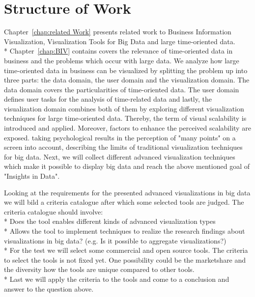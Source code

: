 \section{Structure of Work}
Chapter~\ref{chap:related Work} presents related work to Business Information Visualization, Visualization Tools for Big Data and large time-oriented data.\\*
Chapter~\ref{chap:BIV} contains 
covers the relevance of time-oriented data in business and the problems which occur with large data. We analyze how large time-oriented data in business can be visualized by splitting the problem up into three parts: the data domain, the user domain and the visualization domain. The data domain covers the particularities of time-oriented data. The user domain defines user tasks for the analysis of time-related data and lastly, the visualization domain combines both of them by exploring different visualization techniques for large time-oriented data. Thereby, the term of visual scalability is introduced and applied. Moreover, factors to enhance the perceived scalability are exposed.  
taking psychological results in the perception of "many points" on a screen into account, 
describing the limits of traditional visualization techniques for big data.
Next, we will collect different advanced visualization techniques which make it possible to display big data and reach the above mentioned goal of "Insights in Data". 

Looking at the requirements for the presented advanced visualizations in big data we will bild a criteria catalogue after which some selected tools are judged. The criteria catalogue should involve:\\*
Does the tool enables different kinds of advanced visualization types\\*
Allows the tool to implement techniques to realize the research findings about visualizations in big data? (e.g. Is it possible to aggregate visualizations?) \\*
For the test we will select some commercial and open source tools. The criteria to select the tools is not fixed yet. One possibility could be the marketshare and the diversity how the tools are unique compared to other tools.\\*
Last we will apply the criteria to the tools and come to a conclusion and answer to the question above.
